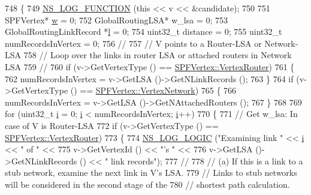 \begin{DoxyCode}
748 \{
749   \hyperlink{log-macros-disabled_8h_a90b90d5bad1f39cb1b64923ea94c0761}{NS\_LOG\_FUNCTION} (\textcolor{keyword}{this} << v << &candidate);
750 
751   SPFVertex* \hyperlink{lte_2model_2fading-traces_2fading__trace__generator_8m_afd61ec66f9d7b807eece6eb12c781844}{w} = 0;
752   GlobalRoutingLSA* w\_lsa = 0;
753   GlobalRoutingLinkRecord *\hyperlink{buildings__pathloss_8m_a5b54c0a045f179bcbbbc9abcb8b5cd4c}{l} = 0;
754   uint32\_t distance = 0;
755   uint32\_t numRecordsInVertex = 0;
756 \textcolor{comment}{//}
757 \textcolor{comment}{// V points to a Router-LSA or Network-LSA}
758 \textcolor{comment}{// Loop over the links in router LSA or attached routers in Network LSA}
759 \textcolor{comment}{//}
760   \textcolor{keywordflow}{if} (v->GetVertexType () == \hyperlink{classns3_1_1SPFVertex_a20f8a4cfc99a1b7ecd10a23151b93afda340822983a2833fff14de88ea20a3f31}{SPFVertex::VertexRouter})
761     \{
762       numRecordsInVertex = v->GetLSA ()->GetNLinkRecords (); 
763     \}
764   \textcolor{keywordflow}{if} (v->GetVertexType () == \hyperlink{classns3_1_1SPFVertex_a20f8a4cfc99a1b7ecd10a23151b93afda00415acb788d8d95bee545fe2046c2a8}{SPFVertex::VertexNetwork})
765     \{
766       numRecordsInVertex = v->GetLSA ()->GetNAttachedRouters (); 
767     \}
768 
769   \textcolor{keywordflow}{for} (uint32\_t \hyperlink{bernuolliDistribution_8m_a6f6ccfcf58b31cb6412107d9d5281426}{i} = 0; \hyperlink{bernuolliDistribution_8m_a6f6ccfcf58b31cb6412107d9d5281426}{i} < numRecordsInVertex; \hyperlink{bernuolliDistribution_8m_a6f6ccfcf58b31cb6412107d9d5281426}{i}++)
770     \{
771 \textcolor{comment}{// Get w\_lsa:  In case of V is Router-LSA}
772       \textcolor{keywordflow}{if} (v->GetVertexType () == \hyperlink{classns3_1_1SPFVertex_a20f8a4cfc99a1b7ecd10a23151b93afda340822983a2833fff14de88ea20a3f31}{SPFVertex::VertexRouter}) 
773         \{
774           \hyperlink{group__logging_ga88acd260151caf2db9c0fc84997f45ce}{NS\_LOG\_LOGIC} (\textcolor{stringliteral}{"Examining link "} << \hyperlink{bernuolliDistribution_8m_a6f6ccfcf58b31cb6412107d9d5281426}{i} << \textcolor{stringliteral}{" of "} << 
775                         v->GetVertexId () << \textcolor{stringliteral}{"'s "} <<
776                         v->GetLSA ()->GetNLinkRecords () << \textcolor{stringliteral}{" link records"});
777 \textcolor{comment}{//}
778 \textcolor{comment}{// (a) If this is a link to a stub network, examine the next link in V's LSA.}
779 \textcolor{comment}{// Links to stub networks will be considered in the second stage of the}
780 \textcolor{comment}{// shortest path calculation.}

\end{DoxyCode}
